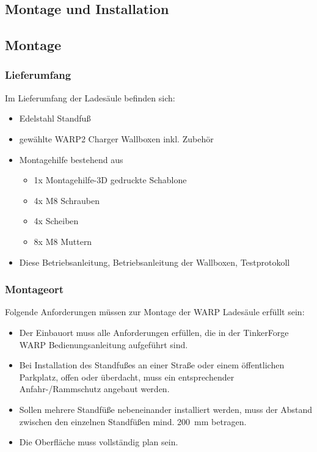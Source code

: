 \documentclass[a4paper,10pt]{article}
\begin{document}
\begin{multicols*}{2}
	\section{Montage und Installation}
	\subsection{Montage}
	\subsubsection{Lieferumfang}
	Im Lieferumfang der Ladesäule befinden sich:
	\begin{itemize}
		\item Edelstahl Standfuß
		\item gewählte WARP2 Charger Wallboxen inkl. Zubehör
		\item Montagehilfe bestehend aus
			\begin{itemize}
				\item 1x Montagehilfe-3D gedruckte Schablone
				\item 4x M8 Schrauben
				\item 4x Scheiben
				\item 8x M8 Muttern
			\end{itemize}
		\item Diese Betriebsanleitung, Betriebsanleitung der Wallboxen,
		Testprotokoll
	\end{itemize}

	\subsubsection{Montageort}

	Folgende Anforderungen müssen zur Montage der WARP Ladesäule erfüllt sein:
	\begin{itemize}
		\item Der Einbauort muss alle Anforderungen erfüllen, die in der
		TinkerForge WARP Bedienungsanleitung aufgeführt sind.
		\item Bei Installation des Standfußes an einer Straße oder einem
		öffentlichen Parkplatz, offen oder überdacht, muss ein entsprechender
		Anfahr-/Rammschutz angebaut werden.
		\item Sollen mehrere Standfüße nebeneinander installiert werden, muss
		der Abstand zwischen den einzelnen Standfüßen mind. \SI{200}{\milli\meter} betragen.
		\item Die Oberfläche muss vollständig plan sein.
	\end{itemize}


\end{multicols*}
\end{document}
